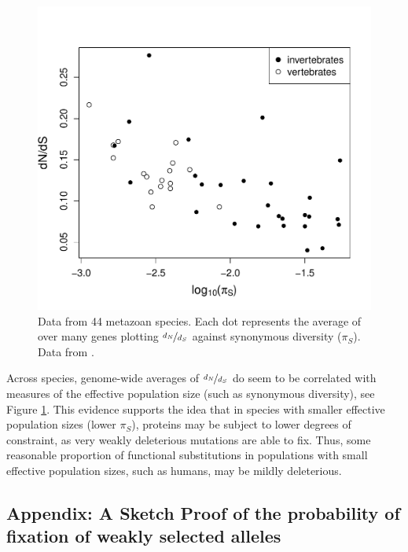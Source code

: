 {%


\begin{figure}
\begin{center}
\includegraphics[width=0.8 \textwidth]{Journal_figs/drift_selection/Galtier_dNdS/Galtier_dNdS.pdf}
\end{center}
\caption{Data from 44 metazoan species. Each dot represents the
  average of over many genes plotting $\nicefrac{d_N}{d_S}$ against synonymous
  diversity ($\pi_S$). Data from \citet{galtier2016adaptive}.  } \label{Galtier_dNdS}
\end{figure}

Across species, genome-wide averages of $\nicefrac{d_N}{d_S}$ do seem to be
correlated with measures of the effective population size (such as
synonymous diversity), see Figure \ref{Galtier_dNdS}. This evidence supports the idea that in species with smaller effective
population sizes (lower $\pi_S$), proteins may be subject to lower degrees of
constraint, as very weakly deleterious mutations are able to fix. Thus,
some reasonable proportion of functional substitutions in populations
with small effective population sizes, such as humans, may be mildly deleterious.

\subsection{Appendix: A Sketch Proof of the probability of fixation of
weakly selected alleles} \label{Section:fixation_weakly_sel}

}
